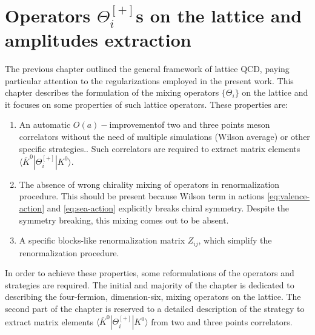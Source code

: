 \documentclass[english, LaM, oneside, noexaminfo]{sapthesis}
\newcommand{\la}{\langle}
\newcommand{\ra}{\rangle}
\newcommand{\oait}{$O(a)-$improvement}
\begin{document}
\chapter{Operators $\Theta_i^{[+]}$s on the lattice and amplitudes extraction}\label{ch:operators}
\lettrine[lines=2, findent=3pt, nindent=0pt]{T}{}he previous chapter outlined the general framework of lattice QCD, paying particular attention to the regularizations employed in the present work.
This chapter describes the formulation of the mixing operators $\{\Theta_i\}$ on the lattice and it focuses on some properties of such lattice operators.
These properties are:
\begin{enumerate}
    \item An automatic \oait\space of two and three points meson correlators without the need of multiple simulations (Wilson average) or other specific strategies..
        Such correlators are required to extract matrix elements $\la \bar K^0 | \Theta_i^{[+]} | K^0 \ra$.
    \item The absence of wrong chirality mixing of operators in renormalization procedure.
        This should be present because Wilson term in actions \ref{eq:valence-action} and \ref{eq:sea-action} explicitly breaks chiral symmetry.
        Despite the symmetry breaking, this mixing comes out to be absent.
    \item A specific blocks-like renormalization matrix $Z_{ij}$, which simplify the renormalization procedure.
\end{enumerate}

\noindent
In order to achieve these properties, some reformulations of the operators and strategies are required.
The initial and majority of the chapter is dedicated to describing the four-fermion, dimension-six, mixing operators on the lattice. 
The second part of the chapter is reserved to a detailed description of the strategy to extract matrix elements $\la \bar K^0 | \Theta_i^{[+]} | K^0 \ra$ from two and three points correlators.
\end{document}
